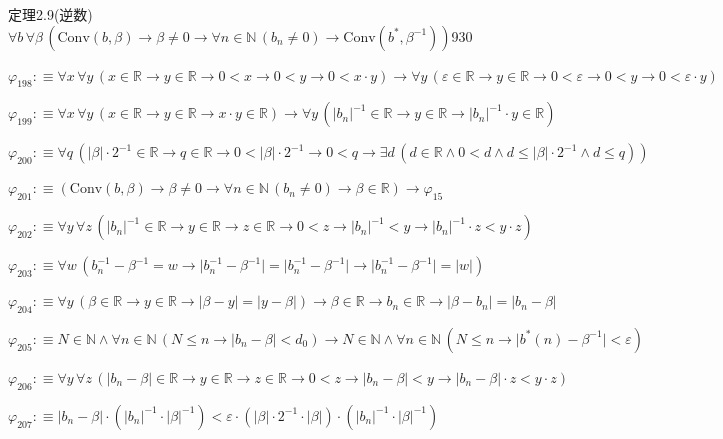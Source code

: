 \begin{fullproof}{定理2.9(逆数)}{$\forall b\,\forall \beta\,(\mathrm{Conv}(b,\beta) \to \beta \neq 0 \to \forall n \in \mathbb{N}\,(b_{n} \neq 0) \to \mathrm{Conv}(b^{\ast},\beta^{-1}))$}{930}
\begin{abbrevlist}
\item $\varphi_{198} :\equiv \forall x\,\forall y\,(x \in \mathbb{R} \to y \in \mathbb{R} \to 0 < x \to 0 < y \to 0 < x \cdot y) \to \forall y\,(\varepsilon \in \mathbb{R} \to y \in \mathbb{R} \to 0 < \varepsilon \to 0 < y \to 0 < \varepsilon \cdot y)$
\item $\varphi_{199} :\equiv \forall x\,\forall y\,(x \in \mathbb{R} \to y \in \mathbb{R} \to x \cdot y \in \mathbb{R}) \to \forall y\,(\lvert b_{n} \rvert^{-1} \in \mathbb{R} \to y \in \mathbb{R} \to \lvert b_{n} \rvert^{-1} \cdot y \in \mathbb{R})$
\item $\varphi_{200} :\equiv \forall q\,(\lvert \beta \rvert \cdot 2^{-1} \in \mathbb{R} \to q \in \mathbb{R} \to 0 < \lvert \beta \rvert \cdot 2^{-1} \to 0 < q \to \exists d\,(d \in \mathbb{R} \land 0 < d \land d \leq \lvert \beta \rvert \cdot 2^{-1} \land d \leq q))$
\item $\varphi_{201} :\equiv (\mathrm{Conv}(b,\beta) \to \beta \neq 0 \to \forall n \in \mathbb{N}\,(b_{n} \neq 0) \to \beta \in \mathbb{R}) \to \varphi_{15}$
\item $\varphi_{202} :\equiv \forall y\,\forall z\,(\lvert b_{n} \rvert^{-1} \in \mathbb{R} \to y \in \mathbb{R} \to z \in \mathbb{R} \to 0 < z \to \lvert b_{n} \rvert^{-1} < y \to \lvert b_{n} \rvert^{-1} \cdot z < y \cdot z)$
\item $\varphi_{203} :\equiv \forall w\,(b_{n}^{-1} - \beta^{-1} = w \to \lvert b_{n}^{-1} - \beta^{-1} \rvert = \lvert b_{n}^{-1} - \beta^{-1} \rvert \to \lvert b_{n}^{-1} - \beta^{-1} \rvert = \lvert w \rvert)$
\item $\varphi_{204} :\equiv \forall y\,(\beta \in \mathbb{R} \to y \in \mathbb{R} \to \lvert \beta - y \rvert = \lvert y - \beta \rvert) \to \beta \in \mathbb{R} \to b_{n} \in \mathbb{R} \to \lvert \beta - b_{n} \rvert = \lvert b_{n} - \beta \rvert$
\item $\varphi_{205} :\equiv N \in \mathbb{N} \land \forall n \in \mathbb{N}\,(N \leq n \to \lvert b_{n} - \beta \rvert < d_{0}) \to N \in \mathbb{N} \land \forall n \in \mathbb{N}\,(N \leq n \to \lvert b^{\ast}(n) - \beta^{-1} \rvert < \varepsilon)$
\item $\varphi_{206} :\equiv \forall y\,\forall z\,(\lvert b_{n} - \beta \rvert \in \mathbb{R} \to y \in \mathbb{R} \to z \in \mathbb{R} \to 0 < z \to \lvert b_{n} - \beta \rvert < y \to \lvert b_{n} - \beta \rvert \cdot z < y \cdot z)$
\item $\varphi_{207} :\equiv \lvert b_{n} - \beta \rvert \cdot (\lvert b_{n} \rvert^{-1} \cdot \lvert \beta \rvert^{-1}) < \varepsilon \cdot (\lvert \beta \rvert \cdot 2^{-1} \cdot \lvert \beta \rvert) \cdot (\lvert b_{n} \rvert^{-1} \cdot \lvert \beta \rvert^{-1})$

\end{abbrevlist}
\end{fullproof}
